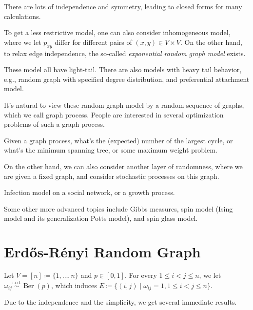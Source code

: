 \begin{note}
	There are lots of independence and symmetry, leading to closed forms for many calculations.
\end{note}

To get a less restrictive model, one can also consider inhomogeneous model, where we let \(p_{xy}\) differ for different pairs of \((x , y) \in V \times V\). On the other hand,  to relax edge independence, the so-called \emph{exponential random graph model} exists.

\begin{remark}
	These model all have light-tail. There are also models with heavy tail behavior, e.g., random graph with specified degree distribution, and preferential attachment model.
\end{remark}

It's natural to view these random graph model by a random sequence of graphs, which we call graph process. People are interested in several optimization problems of such a graph process.

\begin{eg}
	Given a graph process, what's the (expected) number of the largest cycle, or what's the minimum spanning tree, or some maximum weight problem.
\end{eg}

On the other hand, we can also consider another layer of randomness, where we are given a fixed graph, and consider stochastic processes on this graph.

\begin{eg}
	Infection model on a social network, or a growth process.
\end{eg}

Some other more advanced topics include Gibbs measures, spin model (Ising model and its generalization Potts model), and spin glass model.

\section{Erdős-Rényi Random Graph}
\begin{prev}
	Let \(V = [n] \coloneqq \{ 1, \dots , n \} \) and \(p \in [0, 1]\). For every \(1 \leq i < j \leq n\), we let \(\omega _{ij} \overset{\text{i.i.d.} }{\sim } \operatorname{Ber}(p) \), which induces \(E \coloneqq \{ (i, j) \mid \omega _{ij} = 1, 1 \leq i < j \leq n\} \).
\end{prev}

Due to the independence and the simplicity, we get several immediate results.

